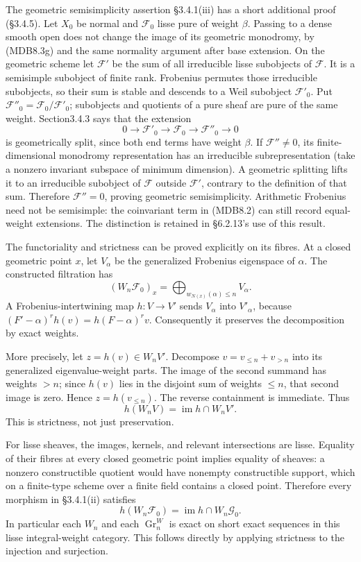 \documentclass[
]{report}
\newcounter{none} %
\begin{document}
The geometric semisimplicity assertion §3.4.1(iii) has a short
additional proof (§3.4.5). Let \(X_0\) be normal and \(\mathcal F_0\)
lisse pure of weight \(\beta\). Passing to a dense smooth open does not
change the image of its geometric monodromy, by (MDB8.3g) and the same
normality argument after base extension. On the geometric scheme let
\(\mathcal F'\) be the sum of all irreducible lisse subobjects of
\(\mathcal F\). It is a semisimple subobject of finite rank. Frobenius
permutes those irreducible subobjects, so their sum is stable and
descends to a Weil subobject \(\mathcal F'_0\). Put
\(\mathcal F''_0=\mathcal F_0/\mathcal F'_0\); subobjects and quotients
of a pure sheaf are pure of the same weight. Section3.4.3 says that the
extension \[
0\longrightarrow\mathcal F'_0
\longrightarrow\mathcal F_0
\longrightarrow\mathcal F''_0
\longrightarrow0
\tag{MDB8.3l}
\] is geometrically split, since both end terms have weight \(\beta\).
If \(\mathcal F''\neq0\), its finite-dimensional monodromy
representation has an irreducible subrepresentation (take a nonzero
invariant subspace of minimum dimension). A geometric splitting lifts it
to an irreducible subobject of \(\mathcal F\) outside \(\mathcal F'\),
contrary to the definition of that sum. Therefore \(\mathcal F''=0\),
proving geometric semisimplicity. Arithmetic Frobenius need not be
semisimple: the coinvariant term in (MDB8.2) can still record
equal-weight extensions. The distinction is retained in §6.2.13's use of
this result.

The functoriality and strictness can be proved explicitly on its fibres.
At a closed geometric point \(x\), let \(V_\alpha\) be the generalized
Frobenius eigenspace of \(\alpha\). The constructed filtration has \[
(W_n\mathcal F_0)_x
=\bigoplus_{w_{N(x)}(\alpha)\leq n}V_\alpha.
\tag{MDB8.4}
\] A Frobenius-intertwining map \(h:V\to V'\) sends \(V_\alpha\) into
\(V'_\alpha\), because \((F'-\alpha)^rh(v)=h(F-\alpha)^rv\).
Consequently it preserves the decomposition by exact weights.

More precisely, let \(z=h(v)\in W_nV'\). Decompose
\(v=v_{\leq n}+v_{>n}\) into its generalized eigenvalue-weight parts.
The image of the second summand has weights \(>n\); since \(h(v)\) lies
in the disjoint sum of weights \(\leq n\), that second image is zero.
Hence \(z=h(v_{\leq n})\). The reverse containment is immediate. Thus \[
\boxed{h(W_nV)=\operatorname{im}h\cap W_nV'.}
\tag{MDB8.5}
\] This is strictness, not just preservation.

For lisse sheaves, the images, kernels, and relevant intersections are
lisse. Equality of their fibres at every closed geometric point implies
equality of sheaves: a nonzero constructible quotient would have
nonempty constructible support, which on a finite-type scheme over a
finite field contains a closed point. Therefore every morphism in
§3.4.1(ii) satisfies \[
h(W_n\mathcal F_0)
=\operatorname{im}h\cap W_n\mathcal G_0.
\tag{MDB8.6}
\] In particular each \(W_n\) and each \(\operatorname{Gr}_n^W\) is
exact on short exact sequences in this lisse integral-weight category.
This follows directly by applying strictness to the injection and
surjection.
\end{document}
